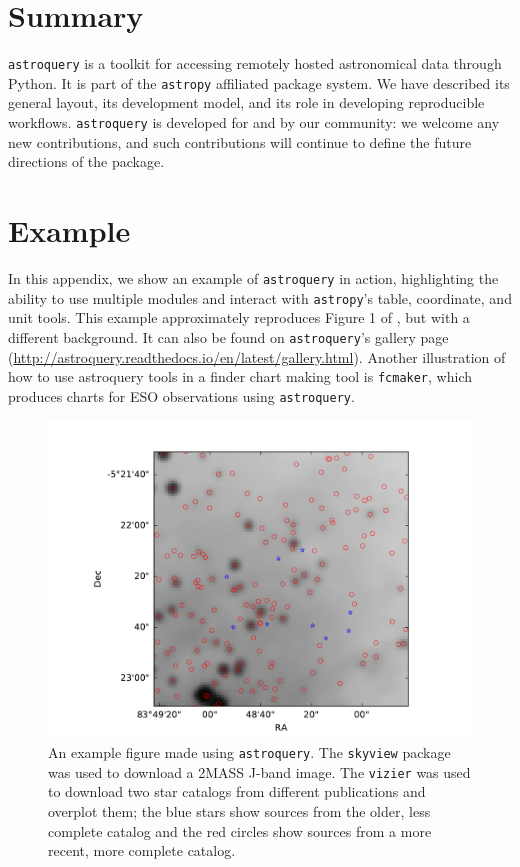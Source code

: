 \documentclass[twocolumn]{aastex62}
\newcommand{\package}[1]{\texttt{#1}\xspace}
\newcommand{\astroquery}{\package{astroquery}}
\newcommand{\astropypkg}{\package{astropy}}
\begin{document}
\section{Summary}
\astroquery is a toolkit for accessing remotely hosted astronomical
data through Python.  It is part of the \astropypkg affiliated package system.
We have described its general layout, its development model, and its role in
developing reproducible workflows.  \astroquery is developed for and by our
community: we welcome any new contributions, and such contributions will continue
to define the future directions of the package.





\appendix
\section{Example}
\label{sec:example}
In this appendix, we show an example of \astroquery in action, highlighting the
ability to use multiple modules and interact with \astropypkg's table, coordinate,
and unit tools.  This example approximately reproduces Figure 1 of
\citet{Eisner2016a}, but with a different background.  It can also be found on
\astroquery's gallery page
(\url{http://astroquery.readthedocs.io/en/latest/gallery.html}).
Another illustration of how to use astroquery tools in a finder chart making
tool is \texttt{fcmaker}, which produces charts for ESO observations using
\astroquery \citep{Vogt2018a}.


\newpage



\begin{figure}[!htp]
\includegraphics[scale=1,width=7in]{example_figure_1.pdf}
\caption{An example figure made using \astroquery.  The \texttt{skyview} package
was used to download a 2MASS J-band image.  The \texttt{vizier} was used to
download two star catalogs from different publications and overplot them; the
blue stars show sources from the older, less complete catalog and the red
circles show sources from a more recent, more complete catalog.
}
\label{fig:example1}
\end{figure}
\end{document}
